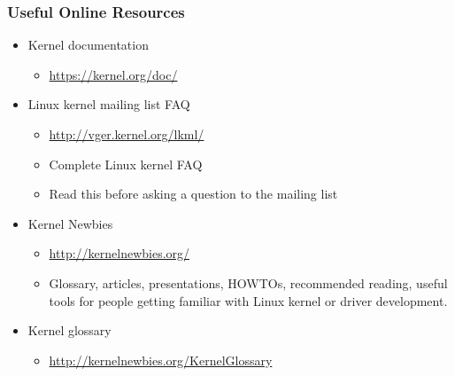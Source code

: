 \begin{frame}
  \frametitle{Useful Online Resources}
  \begin{itemize}
  \item Kernel documentation
    \begin{itemize}
    \item \url{https://kernel.org/doc/}
    \end{itemize}
  \item Linux kernel mailing list FAQ
    \begin{itemize}
    \item \url{http://vger.kernel.org/lkml/}
    \item Complete Linux kernel FAQ
    \item Read this before asking a question to the mailing list
    \end{itemize}
  \item Kernel Newbies
    \begin{itemize}
    \item \url{http://kernelnewbies.org/}
    \item Glossary, articles, presentations, HOWTOs, recommended
      reading, useful tools for people getting familiar with Linux
      kernel or driver development.
    \end{itemize}
  \item Kernel glossary
    \begin{itemize}
    \item \url{http://kernelnewbies.org/KernelGlossary}
    \end{itemize}
\end{itemize}

\end{frame}

